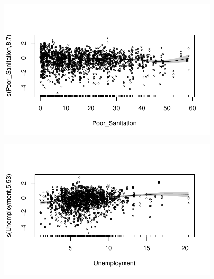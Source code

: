 \documentclass[
  letterpaper,
  DIV=11,
  numbers=noendperiod]{scrartcl}
\begin{document}
\begin{figure}[H]

{\centering \includegraphics{Group34Coursework_files/figure-pdf/unnamed-chunk-16-6.pdf}

}

\end{figure}

\begin{figure}[H]

{\centering \includegraphics{Group34Coursework_files/figure-pdf/unnamed-chunk-16-7.pdf}

}

\end{figure}
\end{document}
